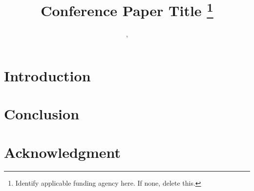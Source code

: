 \documentclass[conference]{IEEEtran}
\begin{document}
\title{Conference Paper Title
\thanks{Identify applicable funding agency here. If none, delete this.}
}

\author{
, %
}

\maketitle

\begin{abstract}

\end{abstract}

\begin{IEEEkeywords}

\end{IEEEkeywords}



\section{Introduction}

\glsresetall


\glsresetall
\section{Conclusion}


\section*{Acknowledgment}


\printbibliography%
\end{document}
